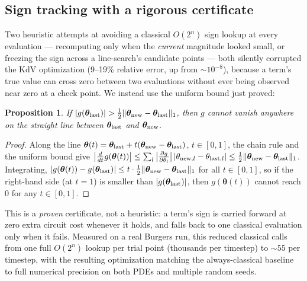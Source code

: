 \documentclass[aps,pra,twocolumn,notitlepage,superscriptaddress,floatfix,10pt]{revtex4-2}
\newtheorem{proposition}{Proposition}
\newcommand{\norm}[1]{\lVert #1 \rVert}
\begin{document}
\subsection{Sign tracking with a rigorous certificate}
\label{sec:signtracker}
Two heuristic attempts at avoiding a classical $O(2^n)$ sign lookup at every evaluation ---
recomputing only when the \emph{current} magnitude looked small, or freezing the sign across a
line-search's candidate points --- both silently corrupted the KdV optimization (9--19\% relative
error, up from $\sim10^{-8}$), because a term's true value can cross zero between two evaluations
without ever being observed near zero at a check point. We instead use the uniform bound just proved:
\begin{proposition}
If $|g(\bm\theta_{\rm last})|>\tfrac12\norm{\bm\theta_{\rm new}-\bm\theta_{\rm last}}_1$, then $g$
cannot vanish anywhere on the straight line between $\bm\theta_{\rm last}$ and $\bm\theta_{\rm new}$.
\end{proposition}
\begin{proof}
Along the line $\bm\theta(t)=\bm\theta_{\rm last}+t(\bm\theta_{\rm new}-\bm\theta_{\rm last})$,
$t\in[0,1]$, the chain rule and the uniform bound give
$\big|\tfrac{d}{dt}g(\bm\theta(t))\big|\le\sum_l\big|\tfrac{\partial g}{\partial\theta_l}\big|\,
|\theta_{{\rm new},l}-\theta_{{\rm last},l}|\le\tfrac12\norm{\bm\theta_{\rm new}-\bm\theta_{\rm
last}}_1$. Integrating, $|g(\bm\theta(t))-g(\bm\theta_{\rm last})|\le t\cdot\tfrac12\norm{\bm\theta_{\rm
new}-\bm\theta_{\rm last}}_1$ for all $t\in[0,1]$, so if the right-hand side (at $t=1$) is smaller
than $|g(\bm\theta_{\rm last})|$, then $g(\bm\theta(t))$ cannot reach $0$ for any $t\in[0,1]$.
\end{proof}
This is a \emph{proven} certificate, not a heuristic: a term's sign is carried forward at zero extra
circuit cost whenever it holds, and falls back to one classical evaluation only when it fails.
Measured on a real Burgers run, this reduced classical calls from one full $O(2^n)$ lookup per trial
point (thousands per timestep) to $\sim55$ per timestep, with the resulting optimization matching the
always-classical baseline to full numerical precision on both PDEs and multiple random seeds.
\end{document}
